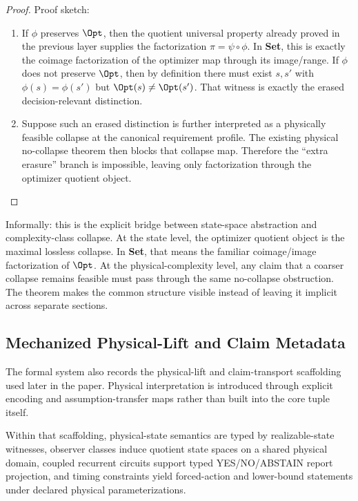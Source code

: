 \begin{proof}
Proof sketch:
\begin{enumerate}
\item If $\phi$ preserves $\Opt$, then the quotient universal property already proved in the previous layer supplies the factorization $\pi = \psi \circ \phi$. In \textbf{Set}, this is exactly the coimage factorization of the optimizer map through its image/range. If $\phi$ does not preserve $\Opt$, then by definition there must exist $s,s'$ with $\phi(s)=\phi(s')$ but $\Opt(s)\neq\Opt(s')$. That witness is exactly the erased decision-relevant distinction.
\item Suppose such an erased distinction is further interpreted as a physically feasible collapse at the canonical requirement profile. The existing physical no-collapse theorem then blocks that collapse map. Therefore the ``extra erasure'' branch is impossible, leaving only factorization through the optimizer quotient object.
\end{enumerate}
\end{proof}

Informally: this is the explicit bridge between state-space abstraction and complexity-class collapse. At the state level, the optimizer quotient object is the maximal lossless collapse. In \textbf{Set}, that means the familiar coimage/image factorization of $\Opt$. At the physical-complexity level, any claim that a coarser collapse remains feasible must pass through the same no-collapse obstruction. The theorem makes the common structure visible instead of leaving it implicit across separate sections.

\subsection{Mechanized Physical-Lift and Claim Metadata}\label{sec:foundations-mechanized-metadata}

The formal system also records the physical-lift and claim-transport scaffolding used later in the paper. Physical interpretation is introduced through explicit encoding and assumption-transfer maps rather than built into the core tuple itself.

Within that scaffolding, physical-state semantics are typed by realizable-state witnesses, observer classes induce quotient state spaces on a shared physical domain, coupled recurrent circuits support typed YES/NO/ABSTAIN report projection, and timing constraints yield forced-action and lower-bound statements under declared physical parameterizations.

